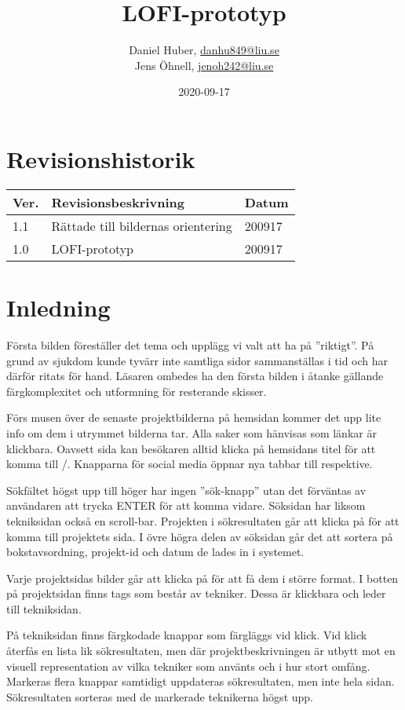 \documentclass{TDP003mall}
\author{Daniel Huber, \url{danhu849@liu.se}\\
  Jens Öhnell, \url{jenoh242@liu.se}}
\title{LOFI-prototyp}
\date{2020-09-17}
\begin{document}
\projectpage
\section{Revisionshistorik}
\begin{table}[!h]
\begin{tabularx}{\linewidth}{|l|X|l|}
\hline
Ver. & Revisionsbeskrivning & Datum \\\hline
1.1 & Rättade till bildernas orientering & 200917 \\\hline
1.0 & LOFI-prototyp & 200917 \\\hline
\end{tabularx}
\end{table}

\section{Inledning}
Första bilden föreställer det tema och upplägg vi valt att ha på ''riktigt''. På grund av sjukdom kunde tyvärr inte samtliga sidor sammanställas i tid och har därför ritats för hand. Läsaren ombedes ha den första bilden i åtanke gällande färgkomplexitet och utformning för resterande skisser.

Förs musen över de senaste projektbilderna på hemsidan kommer det upp lite info om dem i utrymmet bilderna tar. Alla saker som hänvisas som länkar är klickbara. Oavsett sida kan besökaren alltid klicka på hemsidans titel för att komma till /. Knapparna för social media öppnar nya tabbar till respektive.

Sökfältet högst upp till höger har ingen ''sök-knapp'' utan det förväntas av användaren att trycka ENTER för att komma vidare. Söksidan har liksom tekniksidan också en scroll-bar. Projekten i sökresultaten går att klicka på för att komma till projektets sida. I övre högra delen av söksidan går det att sortera på bokstavsordning, projekt-id och datum de lades in i systemet.

Varje projektsidas bilder går att klicka på för att få dem i större format. I botten på projektsidan finns tags som består av tekniker. Dessa är klickbara och leder till tekniksidan.

På tekniksidan finns färgkodade knappar som färgläggs vid klick. Vid klick återfås en lista lik sökresultaten, men där projektbeskrivningen är utbytt mot en visuell representation av vilka tekniker som använts och i hur stort omfång. Markeras flera knappar samtidigt uppdateras sökresultaten, men inte hela sidan. Sökresultaten sorteras med de markerade teknikerna högst upp.
\end{document}
